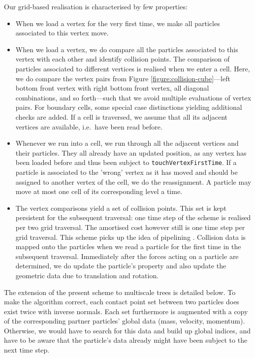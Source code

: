 \documentclass[times,12pt]{article}
\begin{document}
Our grid-based realisation is characterised by few properties:
\begin{itemize}
  \item When we load a vertex for the very first time, we make all particles
  associated to this vertex move. 
  \item When we load a vertex, we do compare all the particles associated to
  this vertex with each other and identify collision points. The comparison of
  particles associated to different vertices is realised when we enter a cell.
  Here, we do compare the vertex pairs from Figure \ref{figure:collision-cube}---left bottom
  front vertex with right bottom front vertex, all diagonal combinations, and
  so forth---such that we avoid multiple evaluations of vertex pairs. For 
  boundary cells, some special case distinctions yielding additional checks are
  added. If a cell is traversed, we assume that all its adjacent vertices are
  available, i.e.~have been read before.
  \item Whenever we run into a cell, we run through all the adjacent vertices
  and their particles. They all already have an updated position, as any vertex
  has been loaded before and thus been subject to \texttt{touchVertexFirstTime}.
  If a particle is associated to the 'wrong' vertex as it has moved and should 
  be assigned to another vertex of the cell, we do the reassignment. A particle
  may move at most one cell of its corresponding level a time.
  \item The vertex comparisons yield a set of collision points. This set is kept
  persistent for the subsequent traversal: one time step of the scheme is
  realised per two grid traversal. The amortised cost however still is one time
  step per grid traversal. This scheme picks up the idea of pipelining
  \cite{Plimpton1995}. Collision data is mapped onto the particles when we read a
  particle for the first time in the subsequent traversal. Immediately after the
  forces acting on a particle are determined, we do update the particle's
  property and also update the geometric data due to translation and rotation.
\end{itemize}

\noindent
The extension of the present scheme to multiscale trees is detailed below.
To make the algorithm correct, each contact point set between two particles does
exist twice with inverse normals.
Each set furthermore is augmented with a copy of the corresponding partner
particles' global data (mass, velocity, momentum).
Otherwise, we would have to search for this data and build up global indices,
and have to be aware that the particle's data already might have been subject to
the next time step.
\end{document}
